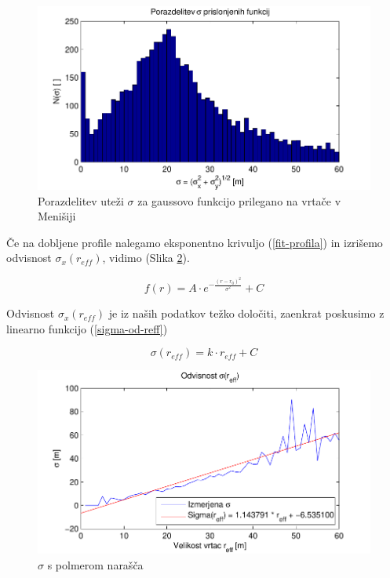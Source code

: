 \documentclass[a4paper, oneside, 12pt]{book}
\begin{document}
  \begin{figure}[H]
    \begin{center}
      \includegraphics{slike/menisija-sigme-hist}
    \end{center}
    \caption{Porazdelitev uteži $\sigma$ za gaussovo funkcijo prilegano na vrtače v Menišiji}
    \label{fig:menisija-sigme-hist}
  \end{figure}

  Če na dobljene profile nalegamo eksponentno krivuljo (\ref{fit-profila}) in izrišemo odvisnost $\sigma_x (r_{eff})$, vidimo (Slika \ref{fig:menisija-sigma}).

  \begin{equation}
    f(r) = A \cdot e^{-\frac{(r-r_0)^2}{\sigma^2}} + C  
    \label{fit-profila}
  \end{equation}

  Odvisnost $\sigma_x(r_{eff})$ je iz naših podatkov težko določiti, zaenkrat poskusimo z linearno funkcijo (\ref{sigma-od-reff})

  \begin{equation}
    \sigma (r_{eff}) = k \cdot r_{eff} + C
    \label{sigma-od-reff}
  \end{equation}

  \begin{figure}[H]
    \centering
    \includegraphics{slike/menisija-sigme}
    \caption{$\sigma$ s polmerom narašča}
    \label{fig:menisija-sigma}
  \end{figure}
\end{document}
